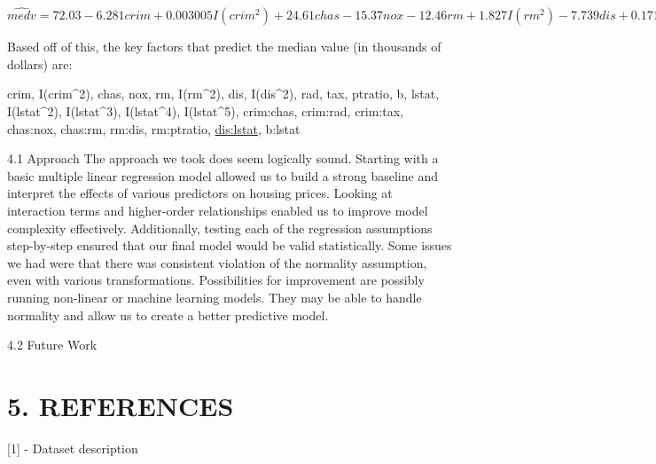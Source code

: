 \documentclass[
]{article}
\begin{document}
\(\hat{medv} = 72.03-6.281crim+0.003005I(crim^2)+24.61chas-15.37nox-12.46rm+1.827I(rm^2)-7.739dis+0.1715I(dis^2)+0.3466rad-0.01298tax+2.704ptratio+0.01990b-4.951lstat+0.5050I(lstat^2)-0.02711I(lstat^3)+0.0006835I(lstat^4)-0.000006415I(lstat^5)+1.485crim:chas-0.3624crim:rad+0.02194crim:tax-22.75chas:nox-1.872chas:rm+0.6587rm:dis-0.5220rm:ptratio+0.09832dis:lstat-0.0006878b:lstat\)

Based off of this, the key factors that predict the median value (in
thousands of dollars) are:

crim, I(crim\^{}2), chas, nox, rm, I(rm\^{}2), dis, I(dis\^{}2), rad,
tax, ptratio, b, lstat, I(lstat\^{}2), I(lstat\^{}3), I(lstat\^{}4),
I(lstat\^{}5), crim:chas, crim:rad, crim:tax, chas:nox, chas:rm, rm:dis,
rm:ptratio, \url{dis:lstat}, b:lstat

4.1 Approach The approach we took does seem logically sound. Starting
with a basic multiple linear regression model allowed us to build a
strong baseline and interpret the effects of various predictors on
housing prices. Looking at interaction terms and higher-order
relationships enabled us to improve model complexity effectively.
Additionally, testing each of the regression assumptions step-by-step
ensured that our final model would be valid statistically. Some issues
we had were that there was consistent violation of the normality
assumption, even with various transformations. Possibilities for
improvement are possibly running non-linear or machine learning models.
They may be able to handle normality and allow us to create a better
predictive model.

4.2 Future Work

\section{5. REFERENCES}\label{references}

{[}1{]} - Dataset description
\end{document}
